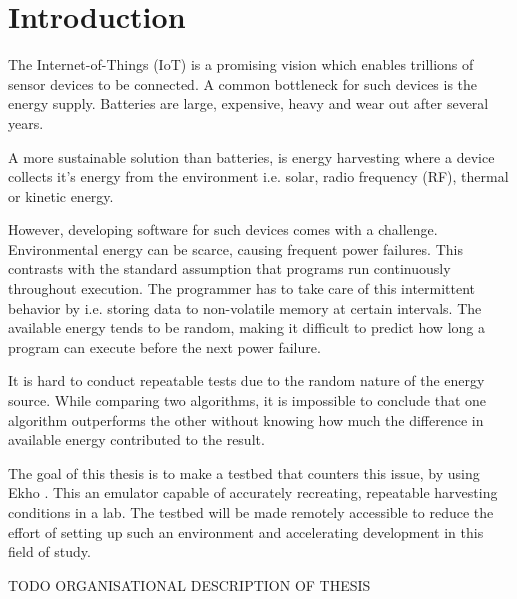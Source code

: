 \chapter{Introduction}
\label{chp:introduction}
The Internet-of-Things (IoT) is a promising vision which enables trillions of sensor devices to be connected. A common bottleneck for such devices is the energy supply. Batteries are large, expensive, heavy and wear out after several years.

A more sustainable solution than batteries, is energy harvesting where a device collects it's energy from the environment i.e. solar, radio frequency (RF), thermal or kinetic energy.

However, developing software for such devices comes with a challenge. Environmental energy can be scarce, causing frequent power failures. This contrasts with the standard assumption that programs run continuously throughout execution. The programmer has to take care of this intermittent behavior by i.e. storing data to non-volatile memory at certain intervals. The available energy tends to be random, making it difficult to predict how long a program can execute before the next power failure. 

It is hard to conduct repeatable tests due to the random nature of the energy source. While comparing two algorithms, it is impossible to conclude that one algorithm outperforms the other without knowing how much the difference in available energy contributed to the result.

The goal of this thesis is to make a testbed that counters this issue, by using Ekho \cite{ekho}. This an emulator capable of accurately recreating, repeatable harvesting conditions in a lab. The testbed will be made remotely accessible to reduce the effort of setting up such an environment and accelerating development in this field of study.

\vspace{1\baselineskip}

\noindent
TODO ORGANISATIONAL DESCRIPTION OF THESIS

